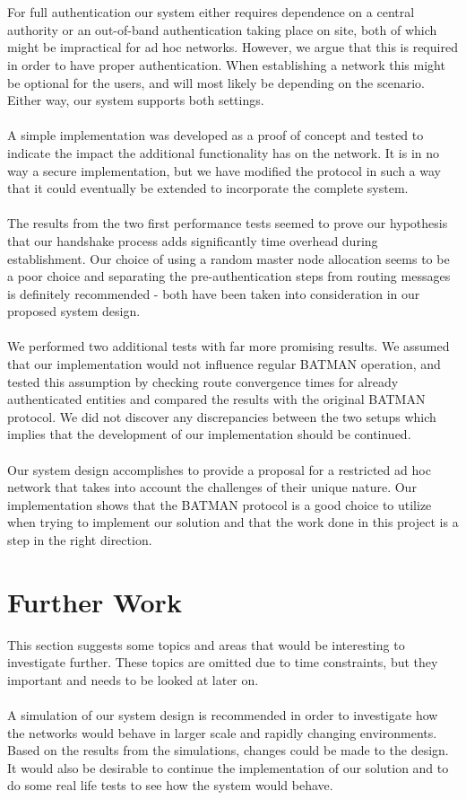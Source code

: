 \\\\
For full authentication our system either requires dependence on a central authority or an out-of-band authentication taking place on site, both of which might be impractical for ad hoc networks. However, we argue that this is required in order to have proper authentication. When establishing a network this might be optional for the users, and will most likely be depending on the scenario. Either way, our system supports both settings.
\\\\
A simple implementation was developed as a proof of concept and tested to indicate the impact the additional functionality has on the network. It is in no way a secure implementation, but we have modified the protocol in such a way that it could eventually be extended to incorporate the complete system.
\\\\
The results from the two first performance tests seemed to prove our hypothesis that our handshake process adds significantly time overhead during establishment. Our choice of using a random master node allocation seems to be a poor choice and separating the pre-authentication steps from routing messages is definitely recommended - both have been taken into consideration in our proposed system design.
\\\\
We performed two additional tests with far more promising results. We assumed that our implementation would not influence regular BATMAN operation, and tested this assumption by checking route convergence times for already authenticated entities and compared the results with the original BATMAN protocol. We did not discover any discrepancies between the two setups which implies that the development of our implementation should be continued.
\\\\
Our system design accomplishes to provide a proposal for a restricted ad hoc network that takes into account the challenges of their unique nature. Our implementation shows that the BATMAN protocol is a good choice to utilize when trying to implement our solution and that the work done in this project is a step in the right direction.

\section{Further Work}\label{further_work}
This section suggests some topics and areas that would be interesting to investigate further. These topics are omitted due to time constraints, but they important and needs to be looked at later on.
\\\\
A simulation of our system design is recommended in order to investigate how the networks would behave in larger scale and rapidly changing environments. Based on the results from the simulations, changes could be made to the design. It would also be desirable to continue the implementation of our solution and to do some real life tests to see how the system would behave.

